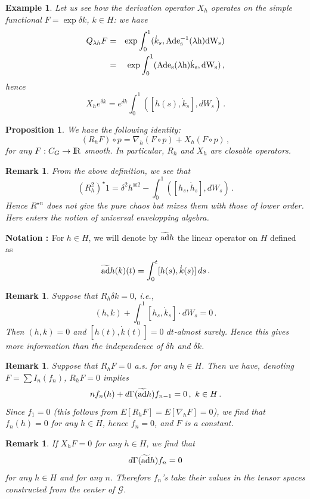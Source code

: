 \documentclass[12pt,a4paper]{book}
\newtheorem{proposition}[theorem]{Proposition}
\newtheorem{remarkk}[theorem]{Remark}
\newtheorem{example}[theorem]{Example}
\newcommand{\Ad}{\rm {Ad}}
\newcommand{\ad}{\rm {ad}}
\newcommand{\tad}{\widetilde{\ad}}
\newcommand{\G}{{\mathcal G}}
\newcommand{\R}{{\rm I\!R}}
\newcommand{\ra}{ \rightarrow }
\begin{document}
\begin{example}
{\rm
Let us see how  the derivation operator $X_h$ operates  on  the simple
functional  $F=\exp \delta k$, $k\in H$: we have
\begin{eqnarray*}
Q_{\lambda h}F&=&\exp\int_0^1({\dot{k}}_s,\Ad e^{-1}_s(\lambda h)dW_s)\\
    &=&\exp\int_0^1(\Ad e_s(\lambda h){\dot{k}}_s,dW_s)\,,
\end{eqnarray*}
hence
$$
X_h e^{\delta k}=e^{\delta k}\int_0^1\left([h(s),{\dot{k}}_s],dW_s\right)\,.
$$}
\end{example}
\begin{proposition}
We have the following identity:
$$
(R_hF)\circ p=\nabla_h(F\circ p)+X_h(F\circ p)\,,
$$
for any $F:C_G\ra \R$ smooth. In particular, $R_h$ and $X_h$ are closable
operators.
\end{proposition}
\begin{remarkk}{\rm
From the above definition, we see that
$$
(R_h^2)^\star 1=
\delta^2 h^{\otimes 2}-\int_0^1\left([h_s,{\dot{h}}_s], dW_s\right)\,.
$$
Hence $R^{\star n}$ does not give the pure chaos but mixes them with those
of lower order. Here enters the notion of universal envelopping algebra.}
\end{remarkk}
{\bf{Notation : }}For $h\in H$, we will denote by $\tad h$ the linear  operator
on $H$ defined as
$$
\tad h(k)(t)=\int_0^t[h(s),{\dot{k}}(s)]\,ds\,.
$$
\begin{remarkk}{\rm
Suppose that $R_h\delta k=0$, i.e.,
$$
(h,k)+\int_0^1 [h_s,{\dot{k}}_s]\cdot dW_s=0\,.
$$
Then $(h,k)=0$ and $[h(t),{\dot{k}}(t)]=0$ $dt$-almost surely. Hence this
gives more information than the independence of  $\delta h$ and $\delta k$.}
\end{remarkk}
\begin{remarkk}{\rm
Suppose that $R_hF=0$ a.s. for any $h\in H$. Then we have, denoting
$F=\sum I_n(f_n)$, $R_hF=0$ implies
$$
 n f_n(h)+d\Gamma(\tad h)f_{n-1}=0\,,\,\,k\in H\,.
$$
Since $f_1=0$ (this follows from $E[R_hF]=E[\nabla_hF]=0$), we find that
$f_n(h)=0$ for any $h\in H$, hence $f_n=0$, and $F$ is a constant.}
\end{remarkk}
\begin{remarkk}{\rm
If $X_hF=0$ for any $h\in H$, we find that
$$
 d\Gamma(\tad h)f_{n}=0
$$
for any $h\in H$ and for any $n$. Therefore $f_n$'s take their values in
the tensor spaces constructed from the center of $\G$.}
\end{remarkk}
\end{document}
